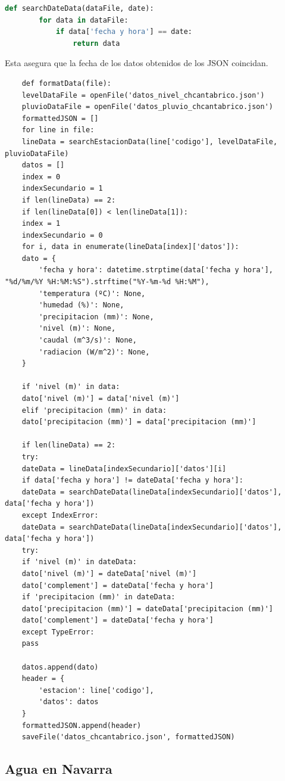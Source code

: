 \begin{lstlisting}[language=Python, caption={Declaración función \textit{searchDateData()}}]
	def searchDateData(dataFile, date):
		for data in dataFile:
			if data['fecha y hora'] == date:
				return data
\end{lstlisting}

Esta asegura que la fecha de los datos obtenidos de los JSON coincidan.

\begin{lstlisting}	
	def formatData(file):
	levelDataFile = openFile('datos_nivel_chcantabrico.json')
	pluvioDataFile = openFile('datos_pluvio_chcantabrico.json')
	formattedJSON = []
	for line in file:
	lineData = searchEstacionData(line['codigo'], levelDataFile, pluvioDataFile)
	datos = []
	index = 0
	indexSecundario = 1
	if len(lineData) == 2:
	if len(lineData[0]) < len(lineData[1]):
	index = 1
	indexSecundario = 0
	for i, data in enumerate(lineData[index]['datos']):
	dato = {
		'fecha y hora': datetime.strptime(data['fecha y hora'], "%d/%m/%Y %H:%M:%S").strftime("%Y-%m-%d %H:%M"),
		'temperatura (ºC)': None,
		'humedad (%)': None,
		'precipitacion (mm)': None,
		'nivel (m)': None,
		'caudal (m^3/s)': None,
		'radiacion (W/m^2)': None,
	}
	
	if 'nivel (m)' in data:
	dato['nivel (m)'] = data['nivel (m)']
	elif 'precipitacion (mm)' in data:
	dato['precipitacion (mm)'] = data['precipitacion (mm)']
	
	if len(lineData) == 2:
	try:
	dateData = lineData[indexSecundario]['datos'][i]
	if data['fecha y hora'] != dateData['fecha y hora']:
	dateData = searchDateData(lineData[indexSecundario]['datos'], data['fecha y hora'])
	except IndexError:
	dateData = searchDateData(lineData[indexSecundario]['datos'], data['fecha y hora'])
	try:
	if 'nivel (m)' in dateData:
	dato['nivel (m)'] = dateData['nivel (m)']
	dato['complement'] = dateData['fecha y hora']
	if 'precipitacion (mm)' in dateData:
	dato['precipitacion (mm)'] = dateData['precipitacion (mm)']
	dato['complement'] = dateData['fecha y hora']
	except TypeError:
	pass
	
	datos.append(dato)
	header = {
		'estacion': line['codigo'],
		'datos': datos
	}
	formattedJSON.append(header)
	saveFile('datos_chcantabrico.json', formattedJSON)
\end{lstlisting}

\subsection{Agua en Navarra}

